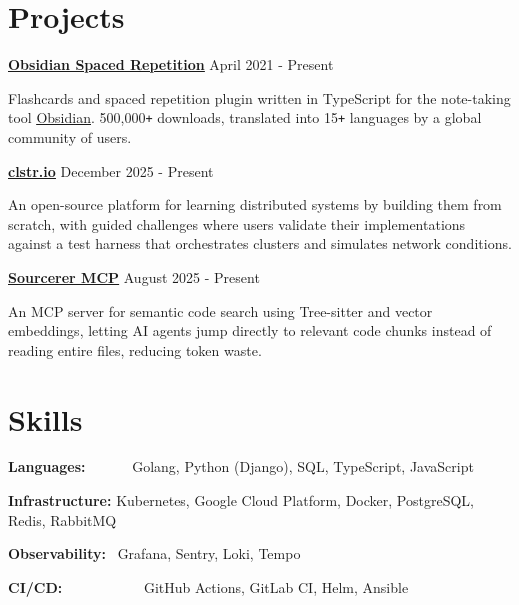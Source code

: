 \documentclass{article}
\newcommand{\experience}[4]{
    {\textbf{#1}} \hfill {#2} \\
    \ifthenelse{\equal{#3}{}}{}{
        {\textbf{\textit{#3}}} \hfill {\textit{#4}} \\
    }
    \vspace{0.425em} %
}
\begin{document}
\section{Projects}
\experience
    {\href{https://github.com/st3v3nmw/obsidian-spaced-repetition}{\textcolor{tuftsblue}{\underline{Obsidian Spaced Repetition}}}}
    {April 2021 - Present}{}{}
    Flashcards and spaced repetition plugin written in TypeScript for the note-taking tool {\href{https://obsidian.md/}{\textcolor{tuftsblue}{\underline{Obsidian}}}}.
    500,000\texttt{+} downloads, translated into 15\texttt{+} languages by a global community of users.
    \vspace{0.75em}
    \newline
\experience
    {\href{https://clstr.io/}{\textcolor{tuftsblue}{\underline{clstr.io}}}}
    {December 2025 - Present}{}{}
    An open-source platform for learning distributed systems by building them from scratch,
    with guided challenges where users validate their implementations against a test harness
    that orchestrates clusters and simulates network conditions.
    \vspace{0.75em}
    \newline
\experience
    {\href{https://github.com/st3v3nmw/sourcerer-mcp/}{\textcolor{tuftsblue}{\underline{Sourcerer MCP}}}}
    {August 2025 - Present}{}{}
    An MCP server for semantic code search using Tree-sitter and vector embeddings,
    letting AI agents jump directly to relevant code chunks instead of reading entire files, reducing token waste.


\section{Skills}

\textbf{Languages:}~~~~~~ Golang, Python (Django), SQL, TypeScript, JavaScript
\vspace{0.5em}

\textbf{Infrastructure:} Kubernetes, Google Cloud Platform, Docker, PostgreSQL, Redis, RabbitMQ
\vspace{0.5em}

\textbf{Observability:}~ Grafana, Sentry, Loki, Tempo
\vspace{0.5em}

\textbf{CI/CD:}~~~~~~~~~~~ GitHub Actions, GitLab CI, Helm, Ansible
\end{document}
